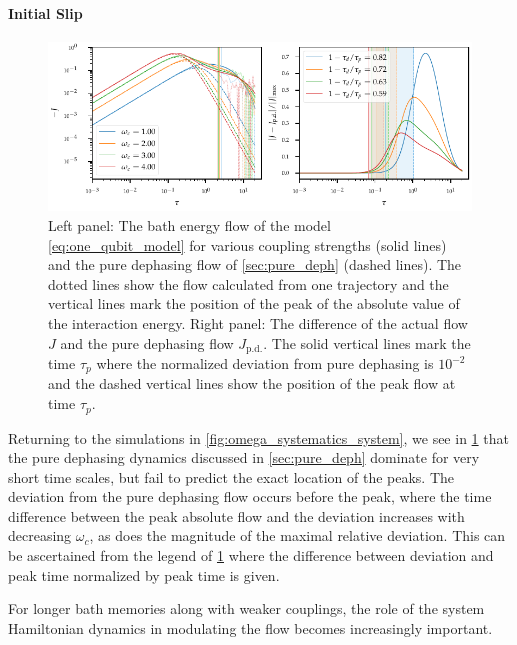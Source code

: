 \paragraph{Initial Slip}
\begin{figure}[h]
  \centering
  \includegraphics{figs/one_bath_syst/omega_initial_slip}
  \caption{\label{fig:omega_initial_slip} Left panel: The bath energy
    flow of the model \cref{eq:one_qubit_model} for various coupling
    strengths (solid lines) and the pure dephasing flow of
    \cref{sec:pure_deph} (dashed lines). The dotted lines show the
    flow calculated from one trajectory and the vertical lines mark
    the position of the peak of the absolute value of the interaction
    energy. Right panel: The difference of the actual flow \(J\) and
    the pure dephasing flow \(J_\mathrm{p.d.}\). The solid vertical
    lines mark the time \(τ_p\) where the normalized deviation from
    pure dephasing is \(10^{-2}\) and the dashed vertical lines show
    the position of the peak flow at time \(τ_p\).}
\end{figure}

Returning to the simulations in \cref{fig:omega_systematics_system},
we see in \cref{fig:omega_initial_slip} that the pure dephasing
dynamics discussed in \cref{sec:pure_deph} dominate for very short
time scales, but fail to predict the exact location of the peaks. The
deviation from the pure dephasing flow occurs before the peak, where
the time difference between the peak absolute flow and the deviation
increases with decreasing \(ω_c\), as does the magnitude of the
maximal relative deviation. This can be ascertained from the legend of
\cref{fig:omega_initial_slip} where the difference between deviation
and peak time normalized by peak time is given.

For longer bath memories along with weaker
couplings, the role of the system Hamiltonian dynamics in modulating
the flow becomes increasingly important.

